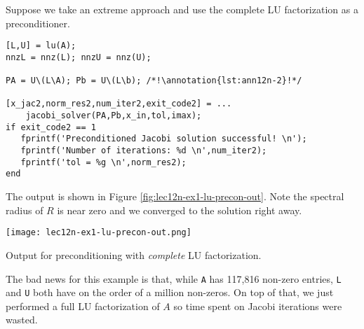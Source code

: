 Suppose we take an extreme approach and use the complete LU factorization as a preconditioner.  
\begin{lstlisting}[style=myMatlab]
[L,U] = lu(A);
nnzL = nnz(L); nnzU = nnz(U);

PA = U\(L\A); Pb = U\(L\b); /*!\annotation{lst:ann12n-2}!*/

[x_jac2,norm_res2,num_iter2,exit_code2] = ...
    jacobi_solver(PA,Pb,x_in,tol,imax);
if exit_code2 == 1
   fprintf('Preconditioned Jacobi solution successful! \n');
   fprintf('Number of iterations: %d \n',num_iter2);
   fprintf('tol = %g \n',norm_res2);
end
\end{lstlisting}
The output is shown in Figure \ref{fig:lec12n-ex1-lu-precon-out}.  Note the spectral radius of $R$ is near zero and we converged to the solution right away.
\begin{marginfigure}
\texttt{[image: lec12n-ex1-lu-precon-out.png]}
\caption{Output for preconditioning with \emph{complete} LU factorization.}
\label{fig:lec12n-ex1-lu-precon-out}
\end{marginfigure}
The bad news for this example is that, while \lstinline[style=myMatlab]{A} has 117,816 non-zero entries, \lstinline[style=myMatlab]{L} and \lstinline[style=myMatlab]{U} both have on the order of a million non-zeros.  On top of that, we just performed a full LU factorization of $A$ so time spent on Jacobi iterations were wasted.

